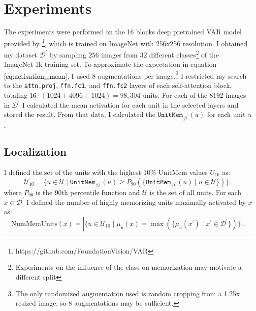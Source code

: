 \documentclass{article} %
\begin{document}
\section{Experiments}
The experiments were performed on the 16 blocks deep pretrained VAR model provided by \citet{tianVisualAutoregressiveModeling2024}\footnote{https://github.com/FoundationVision/VAR}, which is trained on ImageNet with 256x256 resolution.
I obtained my dataset $\mathcal{D}^\prime$ by sampling 256 images from 32 different classes\footnote{Experiments on the influence of the class on memorization may motivate a different split} of the ImageNet-1k training set.
To approximate the expectation in equation \ref{eq:activation_mean}, I used 8 augmentations per image.\footnote{The only randomized augmentation used is random cropping from a 1.25x resized image, so 8 augmentations may be sufficient.}
I restricted my search to the \texttt{attn.proj}, \texttt{ffn.fc1}, and \texttt{ffn.fc2} layers of each self-attention block, totaling $16\cdot (1024 + 4096 + 1024) = 98,304$ units.
For each of the 8192 images in $\mathcal{D}^\prime$ I calculated the mean activation for each unit in the selected layers and stored the result.
From that data, I calculated the $\texttt{UnitMem}_{\mathcal{D}^\prime}(u)$ for each unit $u$.
\subsection{Localization}
I defined the set of the units with the highest 10\% UnitMem values $U_{10}$ as:
\begin{equation}\label{eq:mem_units}
   \mathcal{U}_{10} = \{u \in \mathcal{U} \mid\texttt{UnitMem}_{\mathcal{D}^\prime}(u) \geq P_{90}(\{\texttt{UnitMem}_{\mathcal{D}^\prime}(u) \mid u \in \mathcal{U}\})\},
\end{equation}
where $P_{90}$ is the 90th percentile function and $\mathcal{U}$ is the set of all units.
For each $x \in \mathcal{D}^\prime$ I defined the number of highly memorizing units maximally activated by $x$ as:
\[\text{NumMemUnits}(x) = |\{u \in \mathcal{U}_{10} \mid \mu_u(x) = \max(\{\mu_u(x^\prime) \mid x^\prime \in \mathcal{D}^\prime\})\}|.\]
\end{document}
